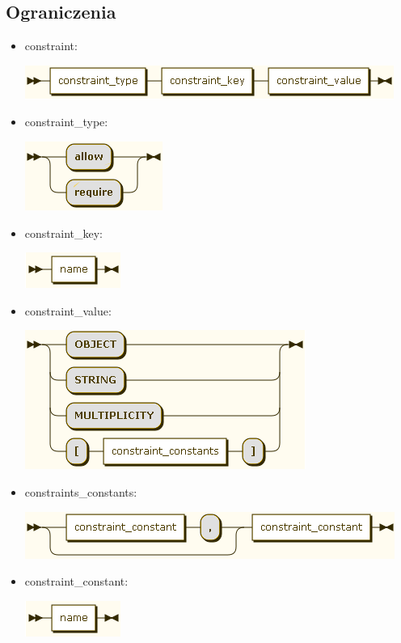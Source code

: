 \documentclass[a4paper,11pt,notitlepage]{article}
\begin{document}
\subsection{Ograniczenia}
\begin{itemize}
\item constraint:

\includegraphics[scale=0.66]{images/grammar/constraint.png}

\item constraint\_type:

\includegraphics[scale=0.66]{images/grammar/constraint_type.png}

\item constraint\_key:

\includegraphics[scale=0.66]{images/grammar/name_xx.png}

\item constraint\_value:

\includegraphics[scale=0.66]{images/grammar/constraint_value.png}

\item constraints\_constants:

\includegraphics[scale=0.66]{images/grammar/constraint_constants.png}

\item constraint\_constant:

\includegraphics[scale=0.66]{images/grammar/name_xx.png}
\end{itemize}
\end{document}
